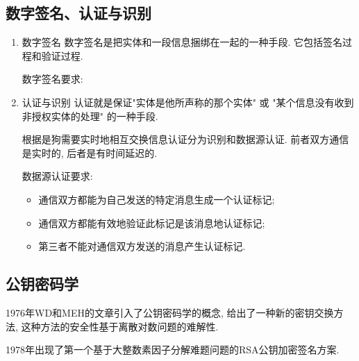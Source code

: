 \documentclass[UTF8]{ctexart}
\begin{document}
    \subsection{数字签名、认证与识别}
    \begin{enumerate}
        \item 数字签名
            数字签名是把实体和一段信息捆绑在一起的一种手段. 它包括签名过程和验证过程.

            数字签名要求:
            \item 认证与识别
                认证就是保证"实体是他所声称的那个实体" 或 "某个信息没有收到非授权实体的处理" 的一种手段.

                根据是狗需要实时地相互交换信息认证分为识别和数据源认证. 前者双方通信是实时的, 后者是有时间延迟的.

                数据源认证要求:
                \begin{itemize}
                    \item 通信双方都能为自己发送的特定消息生成一个认证标记;
                    \item 通信双方都能有效地验证此标记是该消息地认证标记;
                    \item 第三者不能对通信双方发送的消息产生认证标记.
                \end{itemize}
    \end{enumerate}

    \subsection{公钥密码学}
        1976年WD和MEH的文章引入了公钥密码学的概念, 给出了一种新的密钥交换方法, 这种方法的安全性基于离散对数问题的难解性.

        1978年出现了第一个基于大整数素因子分解难题问题的RSA公钥加密签名方案.
\end{document}
